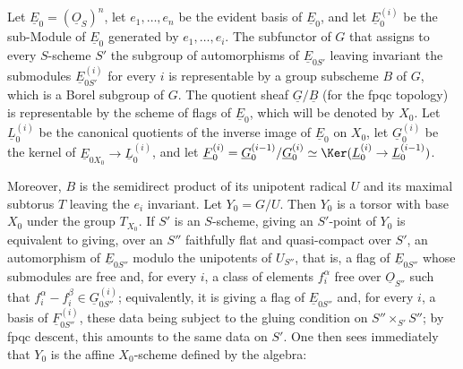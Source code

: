 Let $\underline{E}_0=(\underline{O}_S)^n$, let $e_1,\ldots,e_n$ be the evident basis of $\underline{E}_0$, and let $\underline{E}_0^{(i)}$ be the sub-Module of $\underline{E}_0$ generated by $e_1,\ldots,e_i$. The subfunctor of $G$ that assigns to every $S$-scheme $S'$ the subgroup of automorphisms of $\underline{E}_{0S'}$ leaving invariant the submodules $\underline{E}_{0S'}^{(i)}$ for every $i$ is representable by a group subscheme $B$ of $G$, which is a Borel subgroup of $G$. The quotient sheaf $\underline{G}/\underline{B}$ (for the fpqc topology) is representable by the scheme of flags of $\underline{E}_0$, which will be denoted by $X_0$. Let $\underline{L}_0^{(i)}$ be the canonical quotients of the inverse image of $\underline{E}_0$ on $X_0$, let $\underline{G}_0^{(i)}$ be the kernel of $\underline{E}_{0X_0}\to \underline{L}_0^{(i)}$, and let $\underline{F}_0^{(i)}=\underline{G}_0^{(i-1)}/\underline{G}_0^{(i)}\simeq \Ker(\underline{L}_0^{(i)}\to \underline{L}_0^{(i-1)})$.

Moreover, $B$ is the semidirect product of its unipotent radical $U$ and its maximal subtorus $T$ leaving the $e_i$ invariant. Let $Y_0=G/U$. Then $Y_0$ is a torsor with base $X_0$ under the group $T_{X_0}$. If $S'$ is an $S$-scheme, giving an $S'$-point of $Y_0$ is equivalent to giving, over an $S''$ faithfully flat and quasi-compact over $S'$, an automorphism of $\underline{E}_{0S''}$ modulo the unipotents of $U_{S''}$, that is, a flag of $\underline{E}_{0S''}$ whose submodules are free and, for every $i$, a class of elements $f_i^\alpha$ free over $\underline{O}_{S''}$ such that $f_i^\alpha-f_i^\beta\in \underline{G}_{0S''}^{(i)}$; equivalently, it is giving a flag of $\underline{E}_{0S''}$ and, for every $i$, a basis of $\underline{F}_{0S''}^{(i)}$, these data being subject to the gluing condition on $S''\times_{S'}S''$; by fpqc descent, this amounts to the same data on $S'$. One then sees immediately that $Y_0$ is the affine $X_0$-scheme defined by the algebra:

